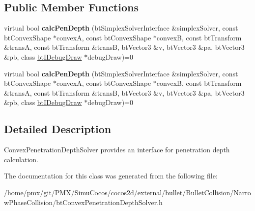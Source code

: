\subsection*{Public Member Functions}
\begin{DoxyCompactItemize}
\item 
\mbox{\label{classbtConvexPenetrationDepthSolver_a6330f083a2847efc4444e94160f0c622}} 
virtual bool {\bfseries calc\+Pen\+Depth} (bt\+Simplex\+Solver\+Interface \&simplex\+Solver, const bt\+Convex\+Shape $\ast$convexA, const bt\+Convex\+Shape $\ast$convexB, const bt\+Transform \&transA, const bt\+Transform \&transB, bt\+Vector3 \&v, bt\+Vector3 \&pa, bt\+Vector3 \&pb, class \hyperlink{classbtIDebugDraw}{bt\+I\+Debug\+Draw} $\ast$debug\+Draw)=0
\item 
\mbox{\label{classbtConvexPenetrationDepthSolver_a6330f083a2847efc4444e94160f0c622}} 
virtual bool {\bfseries calc\+Pen\+Depth} (bt\+Simplex\+Solver\+Interface \&simplex\+Solver, const bt\+Convex\+Shape $\ast$convexA, const bt\+Convex\+Shape $\ast$convexB, const bt\+Transform \&transA, const bt\+Transform \&transB, bt\+Vector3 \&v, bt\+Vector3 \&pa, bt\+Vector3 \&pb, class \hyperlink{classbtIDebugDraw}{bt\+I\+Debug\+Draw} $\ast$debug\+Draw)=0
\end{DoxyCompactItemize}


\subsection{Detailed Description}
Convex\+Penetration\+Depth\+Solver provides an interface for penetration depth calculation. 

The documentation for this class was generated from the following file\+:\begin{DoxyCompactItemize}
\item 
/home/pmx/git/\+P\+M\+X/\+Simu\+Cocos/cocos2d/external/bullet/\+Bullet\+Collision/\+Narrow\+Phase\+Collision/bt\+Convex\+Penetration\+Depth\+Solver.\+h\end{DoxyCompactItemize}
